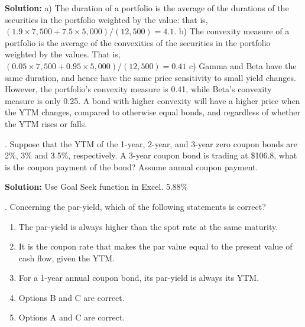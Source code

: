 \documentclass[11.5pt]{article}
\begin{document}
\noindent \textbf{Solution:} a) The duration of a portfolio is the average of the durations of the securities in the portfolio weighted by the value: that is, $(1.9\times7,500+7.5\times5,000)/(12,500)=4.1$.
b) The convexity measure of a portfolio is the average of the convexities of the securities in the portfolio weighted by the values. That is, $(0.05\times7,500+0.95\times5,000)/(12,500)=0.41$
c) Gamma and Beta have the same duration, and hence have the same price sensitivity to small yield changes. However, the portfolio’s convexity measure is 0.41, while Beta’s convexity measure is only 0.25. A bond with higher convexity will have a higher price when the YTM changes, compared to otherwise equal bonds, and regardless of whether the YTM rises or falls. %


\vspace{50pt}




. Suppose that the YTM of the 1-year, 2-year, and 3-year zero coupon bonds are 2\%, 3\% and 3.5\%, respectively. A 3-year coupon bond is trading at \$106.8, what is the coupon payment of the bond? Assume annual coupon payment.


\noindent \textbf{Solution:} Use Goal Seek function in Excel. 5.88\%


\vspace{50pt}




. Concerning the par-yield, which of the following statements is correct?

\begin{enumerate}[a]
	
	\item The par-yield is always higher than the spot rate at the same maturity.
	
	\item It is the coupon rate that makes the par value equal to the present value of cash flow, given the YTM.
	
	\item For a 1-year annual coupon bond, its par-yield is always its YTM.
	
	\item Options B and C are correct.
	
	\item Options A and C are correct.
\end{enumerate}
\end{document}
